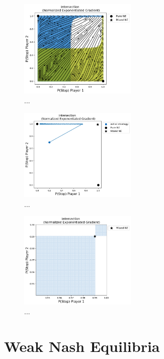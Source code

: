 \begin{figure}
    \centering
    \includegraphics[width=0.5\textwidth]{logos/Intersection4.png}
    \caption{...}
    \label{Intersection4}
\end{figure}

\begin{figure}
    \centering
    \includegraphics[width=0.5\textwidth]{logos/Intersection5.png}
    \caption{...}
    \label{Intersection5}
\end{figure}

\begin{figure}
    \centering
    \includegraphics[width=0.5\textwidth]{logos/Intersection6.png}
    \caption{...}
    \label{Intersection6}
\end{figure}


\section{Weak Nash Equilibria}\label{section:WeakNashEquilibria}

